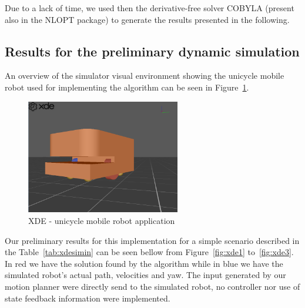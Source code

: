 Due to a lack of time, we used then the derivative-free solver COBYLA (present also in the NLOPT package) to generate the results presented in the following.


\subsection{Results for the preliminary dynamic simulation}



An overview of the simulator visual environment showing the unicycle mobile robot used for implementing the algorithm can be seen in Figure~\ref{fig:xde}.
\begin{figure}[H]
	\centering
	\includegraphics[width=0.6\textwidth]{./images/xde4.png}
	\caption{XDE - unicycle mobile robot application\label{fig:xde}}
\end{figure}

Our preliminary results for this implementation for a simple scenario described in the Table~\ref{tab:xdesimin} can be seen bellow from Figure~\ref{fig:xde1} to~\ref{fig:xde3}. In red we have the solution found by the algorithm while in blue we have the simulated robot's actual path, velocities and yaw. The input generated by our motion planner were directly send to the simulated robot, no controller nor use of state feedback information were implemented.


